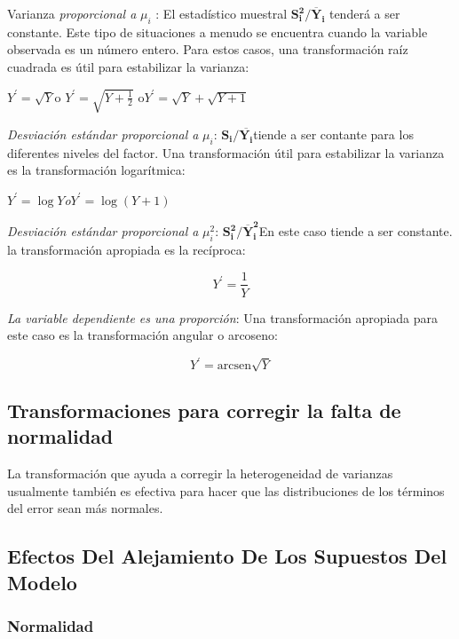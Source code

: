 \documentclass[]{book}
\theoremstyle{definition}
\theoremstyle{definition}
\theoremstyle{definition}
\theoremstyle{remark}
\begin{document}
Varianza \emph{proporcional a} \(\mu_{i}\) : El estadístico muestral
\(\mathbf{S}_\mathbf{i}^\mathbf{2}\mathbf{/}{\overline{\mathbf{Y}}}_{\mathbf{i}}\)
tenderá a ser constante. Este tipo de situaciones a menudo se encuentra
cuando la variable observada es un número entero. Para estos casos, una
transformación raíz cuadrada es útil para estabilizar la varianza:

\(Y^{'} = \sqrt{Y}\)o \(Y^{'} = \sqrt{Y + \frac{1}{2}}\)
o\(Y^{'} = \sqrt{Y} + \sqrt{Y + 1}\)

\emph{Desviación estándar proporcional a} \(\mu_{i}\):
\(\mathbf{S}_\mathbf{i}\mathbf{/}\overline{\mathbf{Y}_\mathbf{i}}\)tiende
a ser contante para los diferentes niveles del factor. Una
transformación útil para estabilizar la varianza es la transformación
logarítmica:

\(Y^{'} = \log Y\)\emph{o}\(Y^{'} = \log{(Y + 1)}\)

\emph{Desviación estándar proporcional a} \(\mu_{i}^{2}\):
\(\mathbf{S}_\mathbf{i}^{\mathbf{2}}\mathbf{/}\overline{\mathbf{Y}}_{\mathbf{i}}^{\mathbf{2}}\)En
este caso tiende a ser constante. la transformación apropiada es la
recíproca:

\[
Y^{'} = \frac{1}{Y}
\]

\emph{La variable dependiente es una proporción}: Una transformación
apropiada para este caso es la transformación angular o arcoseno:

\[
Y^{'} = \text{arcsen}\sqrt{Y}
\]

\hypertarget{transformaciones-para-corregir-la-falta-de-normalidad}{%
\subsection{Transformaciones para corregir la falta de
normalidad}\label{transformaciones-para-corregir-la-falta-de-normalidad}}

La transformación que ayuda a corregir la heterogeneidad de varianzas
usualmente también es efectiva para hacer que las distribuciones de los
términos del error sean más normales.

\hypertarget{efectos-del-alejamiento-de-los-supuestos-del-modelo}{%
\subsection{Efectos Del Alejamiento De Los Supuestos Del
Modelo}\label{efectos-del-alejamiento-de-los-supuestos-del-modelo}}

\hypertarget{normalidad}{%
\subsubsection{Normalidad}\label{normalidad}}
\end{document}
